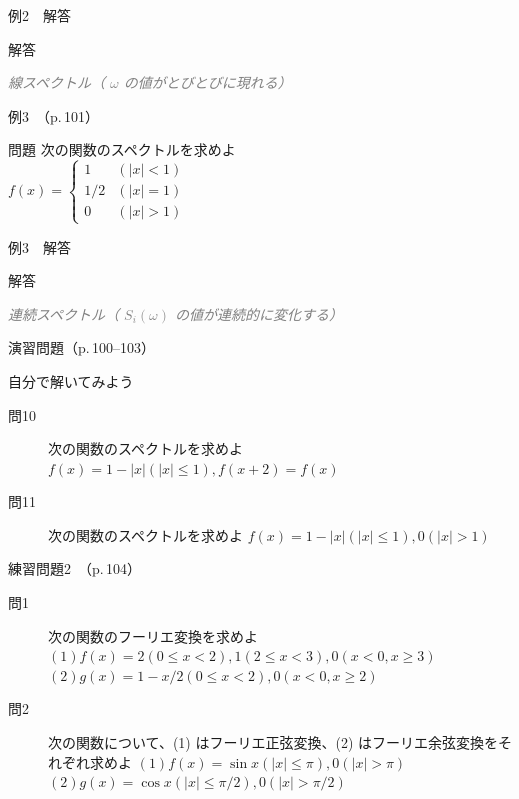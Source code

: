 \documentclass[aspectratio=43,professionalfonts,handout]{beamer}
\begin{document}
\begin{frame}{例2　解答}
  \begin{exampleblock}{解答}
  \end{exampleblock}
  {\footnotesize \textcolor{gray}{\textit{線スペクトル（ $\omega$ の値がとびとびに現れる）}}}
\end{frame}

\begin{frame}{例3　（p.\,101）}
  \begin{exampleblock}{問題}
    次の関数のスペクトルを求めよ\\[2pt]
    $f(x) = \begin{cases} 1 & (|x| < 1) \\ 1/2 & (|x| = 1) \\ 0 & (|x| > 1) \end{cases}$\\[2pt]
  \end{exampleblock}
\end{frame}

\begin{frame}{例3　解答}
  \begin{exampleblock}{解答}
  \end{exampleblock}
  {\footnotesize \textcolor{gray}{\textit{連続スペクトル（ $S_i(\omega)$ の値が連続的に変化する）}}}
\end{frame}

\begin{frame}{演習問題（p.\,100--103）}
  \begin{exampleblock}{自分で解いてみよう}
  \begin{description}
    \item[問10] 次の関数のスペクトルを求めよ
    $f(x) = 1 - |x|  (|x| \leq 1),  f(x+2) = f(x)$\\
    \item[問11] 次の関数のスペクトルを求めよ
    $f(x) = { 1-|x|  (|x| \leq 1),  0  (|x| > 1) }$\\
  \end{description}
  \end{exampleblock}
\end{frame}

\begin{frame}{練習問題2　（p.\,104）}
  \begin{block}{}
  \begin{description}
    \item[問1] 次の関数のフーリエ変換を求めよ
    $(1) f(x) = { 2  (0 \leq x < 2),  1  (2 \leq x < 3),  0  (x < 0, x \geq 3) }$\\
    $(2) g(x) = { 1 - x/2  (0 \leq x < 2),  0  (x < 0, x \geq 2) }$\\
    \item[問2] 次の関数について、(1) はフーリエ正弦変換、(2) はフーリエ余弦変換をそれぞれ求めよ
    $(1) f(x) = { \sin x  (|x| \leq \pi),  0  (|x| > \pi) }$\\
    $(2) g(x) = { \cos x  (|x| \leq \pi/2),  0  (|x| > \pi/2) }$\\
  \end{description}
  \end{block}
\end{frame}
\end{document}
